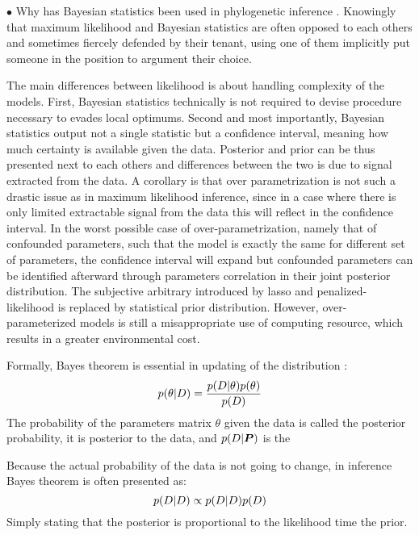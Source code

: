 $\bullet$ Why has Bayesian statistics been used in phylogenetic inference \citep{Lartillot2020}.
Knowingly that maximum \gls{likelihood} and Bayesian statistics are often opposed to each others and sometimes fiercely defended by their tenant, using one of them implicitly put someone in the position to argument their choice.

The main differences between likelihood is about handling complexity of the models.
First, Bayesian statistics technically is not required to devise procedure necessary to evades local optimums.
Second and most importantly, Bayesian statistics output not a single statistic but a confidence interval, meaning how much certainty is available given the data.
Posterior and \gls{prior} can be thus presented next to each others and differences between the two is due to signal extracted from the data.
A corollary is that over parametrization is not such a drastic issue as in maximum \gls{likelihood} inference, since in a case where there is only limited extractable signal from the data this will reflect in the confidence interval.
In the worst possible case of over-parametrization, namely that of confounded parameters, such that the model is exactly the same for different set of parameters, the confidence interval will expand but confounded parameters can be identified afterward through parameters correlation in their joint \gls{posterior} distribution.
The subjective arbitrary introduced by lasso and penalized-likelihood is replaced by statistical \gls{prior} distribution.
However, over-parameterized models is still a misappropriate use of computing resource, which results in a greater environmental cost.

Formally, Bayes theorem is essential in updating of the distribution :
\begin{equation}
	p(\theta|D)=\frac{p(D|\theta)p(\theta)}{p(D)}
\end{equation}
The probability of the parameters matrix $\theta$ given the data is called the \gls{posterior} probability, it is \gls{posterior} to the data, and $p(D|\bm{P})$ is the 

Because the actual probability of the data is not going to change, in inference Bayes theorem is often presented as:
\begin{equation}
p(D|D) \propto p(D|D)p(D)
\end{equation}
Simply stating that the \gls{posterior} is proportional to the \gls{likelihood} time the \gls{prior}.

